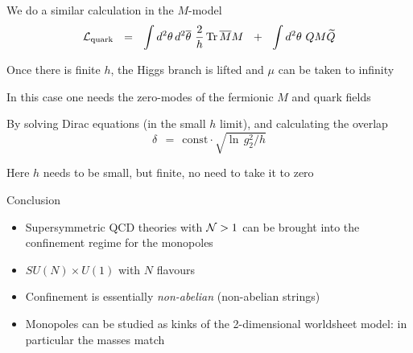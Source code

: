 \documentclass[12pt,letterpaper,landscape,KOMA,smallheadings,calcdimensions,display]{powersem}
\newcommand{\sunu}{SU(N) \times U(1)}
\begin{document}
\begin{slide}

	We do a similar calculation in the $M$-model
\[
	\mathcal{L}_{\rm quark} ~~=~~ \int d^2\theta\, d^2\overline{\theta}~  \frac{2}{h}\, {\rm Tr}\, \overline{M}M  ~~+~~
			\int d^2\theta~ Q M\widetilde{Q}
\]

	Once there is finite $h$, the Higgs branch is lifted and $\mu$ can
	be taken to infinity

	In this case one needs the zero-modes of the fermionic $M$ and quark fields

	By solving Dirac equations (in the small $ h $ limit), and calculating the overlap
\[
	\delta ~~=~~ \text{const} \cdot \sqrt{\ln\, g_2^2 / h}
\]

	Here $ h $ needs to be small, but finite, no need to take it to zero

\end{slide}

\begin{slide}
{
\fontsize{20pt}{20pt}\selectfont
\begin{center} 
	Conclusion
\end{center}
}
\vspace*{\fill}
\begin{itemize}
\item
	Supersymmetric QCD theories with $ \mathcal{N}>1 $ can be brought into the confinement
	regime for the monopoles

\item
	$ \sunu $ with $ N $ flavours

\item
	Confinement is essentially \emph{non-abelian} (non-abelian strings)

\item
	Monopoles can be studied as kinks of the 2-dimensional worldsheet model: in particular
	the masses match

\end{itemize}
\vspace*{\fill}
\end{slide}
\end{document}
